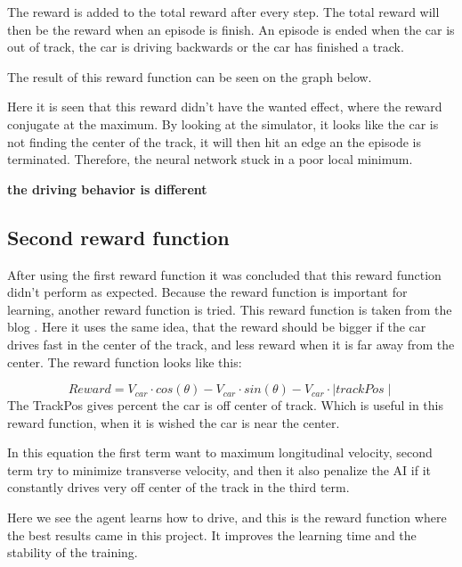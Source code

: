 The reward is added to the total reward after every step. The total reward will then be the reward when an episode is finish. An episode is ended when the car is out of track, the car is driving backwards or the car has finished a track. 

The result of this reward function can be seen on the graph below. 

Here it is seen that this reward didn't have the wanted effect, where the reward conjugate at the maximum. By looking at the simulator, it looks like the car is not finding the center of the track, it will then hit an edge an the episode is terminated. Therefore, the neural network stuck in a poor local minimum.  

\textbf{the driving behavior is different}

\subsection*{Second reward function}
After using the first reward function it was concluded that this reward function didn't perform as expected. Because the reward function is important for learning, another reward function is tried. This reward function is taken from the blog \cite{DDPG_Torcs}. Here it uses the same idea, that the reward should be bigger if the car drives fast in the center of the track, and less reward when it is far away from the center. The reward function looks like this:

\begin{equation}
Reward = V_{car} \cdot cos(\theta) - V_{car} \cdot sin(\theta) - V_{car} \cdot \mid trackPos\mid 
\end{equation}
The TrackPos gives percent the car is off center of track. Which is useful in this reward function, when it is wished the car is near the center.  

In this equation the first term want to maximum longitudinal velocity, second term try to minimize transverse velocity, and then it also penalize the AI if it constantly drives very off center of the track in the third term.

Here we see the agent learns how to drive, and this is the reward function where the best results came in this project. It improves the learning time and the stability of the training. 